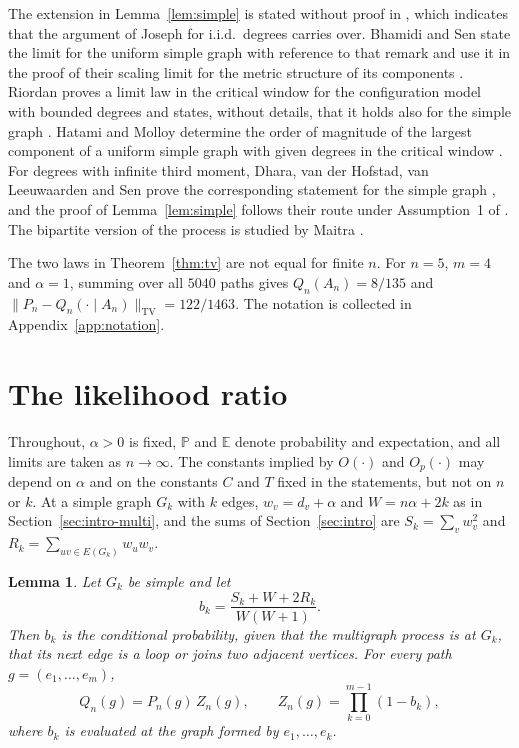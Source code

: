 \documentclass[11pt]{amsart}
\newtheorem{lemma}[theorem]{Lemma}
\theoremstyle{remark}
\numberwithin{equation}{section}
\newcommand{\PP}{\mathbb{P}}
\newcommand{\EE}{\mathbb{E}}
\newcommand{\TV}{\mathrm{TV}}
\begin{document}
The extension in Lemma~\ref{lem:simple} is stated without proof in \cite[Remark~5]{DHLS17}, which indicates that the argument of Joseph \cite[Section~7]{Jo14} for i.i.d.\ degrees carries over. Bhamidi and Sen state the limit for the uniform simple graph with reference to that remark \cite[Theorem~5.3]{BS20} and use it in the proof of their scaling limit for the metric structure of its components \cite[Section~9]{BS20}. Riordan proves a limit law in the critical window for the configuration model with bounded degrees and states, without details, that it holds also for the simple graph \cite[Theorems~1.3 and~1.5]{Ri12}. Hatami and Molloy determine the order of magnitude of the largest component of a uniform simple graph with given degrees in the critical window \cite[Theorem~1.1]{HM12}. For degrees with infinite third moment, Dhara, van der Hofstad, van Leeuwaarden and Sen prove the corresponding statement for the simple graph \cite[Theorem~3 and Section~7]{DHLS20}, and the proof of Lemma~\ref{lem:simple} follows their route under Assumption~1 of \cite{DHLS17}. The bipartite version of the process is studied by Maitra \cite{Ma25}.

The two laws in Theorem~\ref{thm:tv} are not equal for finite $n$. For $n=5$, $m=4$ and $\alpha=1$, summing over all $5040$ paths gives $Q_n(A_n)=8/135$ and $\|P_n-Q_n(\cdot\mid A_n)\|_{\TV}=122/1463$. The notation is collected in Appendix~\ref{app:notation}.

\section{The likelihood ratio}\label{sec:lik}

Throughout, $\alpha>0$ is fixed, $\PP$ and $\EE$ denote probability and expectation, and all limits are taken as $n\to\infty$. The constants implied by $O(\cdot)$ and $O_p(\cdot)$ may depend on $\alpha$ and on the constants $C$ and $T$ fixed in the statements, but not on $n$ or $k$. At a simple graph $G_k$ with $k$ edges, $w_v=d_v+\alpha$ and $W=n\alpha+2k$ as in Section~\ref{sec:intro-multi}, and the sums of Section~\ref{sec:intro} are $S_k=\sum_v w_v^2$ and $R_k=\sum_{uv\in E(G_k)}w_uw_v$.

\begin{lemma}\label{lem:lik}
Let $G_k$ be simple and let
\begin{equation}\label{eq:b}
b_k=\frac{S_k+W+2R_k}{W(W+1)} .
\end{equation}
Then $b_k$ is the conditional probability, given that the multigraph process is at $G_k$, that its next edge is a loop or joins two adjacent vertices. For every path $g=(e_1,\dots,e_m)$,
\begin{equation}\label{eq:lik}
Q_n(g)=P_n(g)\,Z_n(g),\qquad Z_n(g)=\prod_{k=0}^{m-1}(1-b_k),
\end{equation}
where $b_k$ is evaluated at the graph formed by $e_1,\dots,e_k$.
\end{lemma}
\end{document}
